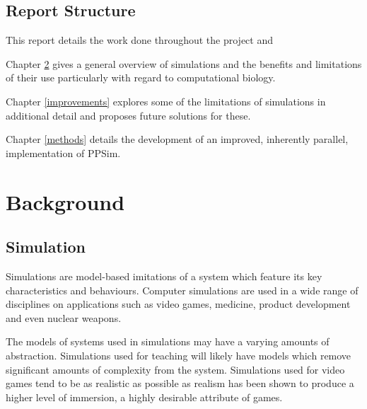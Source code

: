 \documentclass{UoYCSproject}
\begin{document}
\section{Report Structure}
This report details the work done throughout the project and 

Chapter \ref{background} gives a general overview of simulations and the benefits and limitations of their use particularly with regard to computational biology.

Chapter \ref{improvements} explores some of the limitations of simulations in additional detail and proposes future solutions for these.

Chapter \ref{methods} details the development of an improved, inherently parallel, implementation of PPSim.


\chapter{Background}
\label{background}
%

\section{Simulation}
Simulations are model-based imitations of a system which feature its key characteristics and behaviours. Computer simulations are used in a wide range of disciplines on applications such as video games, medicine, product development and even nuclear weapons.

The models of systems used in simulations may have a varying amounts of abstraction. Simulations used for teaching will likely have models which remove significant amounts of complexity from the system. Simulations used for video games tend to be as realistic as possible as realism has been shown to produce a higher level of immersion\cite{realism_immersion}, a highly desirable attribute of games.%
\end{document}
